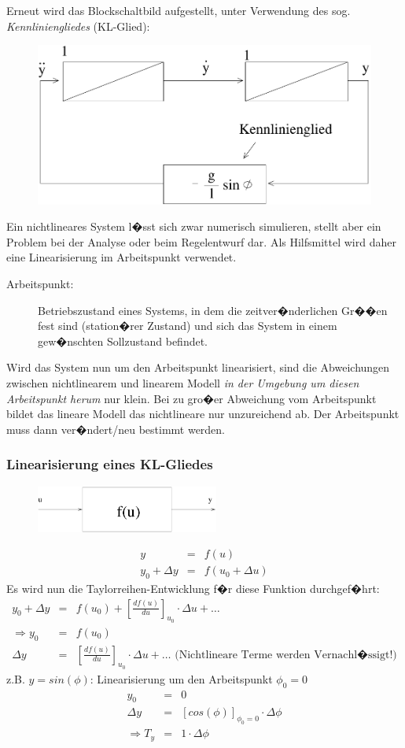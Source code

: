 \documentclass[12pt,a4paper,ngerman]{scrartcl}
\begin{document}
Erneut wird das Blockschaltbild aufgestellt, unter Verwendung des sog. \emph{Kennliniengliedes} (KL-Glied):

\begin{figure}[H]
  \centering
  \includegraphics[width=.5\linewidth]{sysregel_bsb4}
\end{figure}

Ein nichtlineares System l�sst sich zwar numerisch simulieren, stellt aber ein Problem bei der Analyse oder beim Regelentwurf dar. Als Hilfsmittel wird daher eine Linearisierung im Arbeitspunkt verwendet.
\begin{description}
\item[Arbeitspunkt: ]Betriebszustand eines Systems, in dem die zeitver�nderlichen Gr��en fest sind (station�rer Zustand) und sich das System in einem gew�nschten Sollzustand befindet. 
\end{description}
Wird das System nun um den Arbeitspunkt linearisiert, sind die Abweichungen zwischen nichtlinearem und linearem Modell \emph{in der Umgebung um diesen Arbeitspunkt herum }nur klein. Bei zu gro�er Abweichung vom Arbeitspunkt bildet das lineare Modell das nichtlineare nur unzureichend ab. Der Arbeitspunkt muss dann ver�ndert/neu bestimmt werden. 

\subsubsection*{Linearisierung eines KL-Gliedes}
\begin{figure}[H]
\center
  \includegraphics[width=6cm]{sysregel_klglied}
\end{figure}

\begin{eqnarray*}
  y&=&f(u) \\
y_0+ \Delta y &=& f(u_0+ \Delta u)
\end{eqnarray*}
Es wird nun die Taylorreihen-Entwicklung f�r diese Funktion durchgef�hrt:
\begin{eqnarray*}
  y_0+\Delta y &=& f(u_0) + [\frac{df(u)}{du}]_{u_0} \cdot \Delta u + \dots\\
  \Rightarrow y_0& =& f(u_0)\\ \Delta y &=&[\frac{df(u)}{du}]_{u_0} \cdot \Delta u + \dots \text{ (Nichtlineare Terme werden Vernachl�ssigt!)}
\end{eqnarray*}
z.B. $y=sin(\phi)$: Linearisierung um den Arbeitspunkt $\phi_0 =0$
\begin{eqnarray*}
y_0 &=& 0\\
\Delta y&=& [cos(\phi)]_{\phi_0 =0} \cdot \Delta \phi\\
\Rightarrow T_y &=& 1 \cdot \Delta \phi 
\end{eqnarray*}
\end{document}

